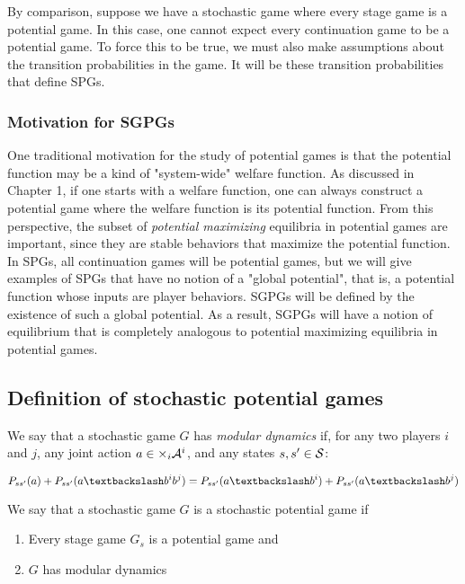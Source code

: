 By comparison, suppose we have a stochastic game where every stage game is a potential game. In this case, one cannot expect every continuation game to be a potential game. To force this to be true, we must also make assumptions about the transition probabilities in the game. It will be these transition probabilities that define SPGs.


\subsubsection{Motivation for SGPGs}

One traditional motivation for the study of potential games is that the potential function may be a kind of "system-wide" welfare function. As discussed in Chapter 1, if one starts with a welfare function, one can always construct a potential game where the welfare function is its potential function. From this perspective, the subset of {\em potential maximizing} equilibria in potential games are important, since they are stable behaviors that maximize the potential function. In SPGs, all continuation games will be potential games, but we will give examples of SPGs that have no notion of a "global potential", that is, a potential function whose inputs are player behaviors. SGPGs will be defined by the existence of such a global potential. As a result, SGPGs will have a notion of equilibrium that is completely analogous to potential maximizing equilibria in potential games.


\subsection{Definition of stochastic potential games}

\begin{mydef}
We say that a stochastic game $G$ has {\em modular dynamics} if, for any two players $i$ and $j$, any joint action $a \in \times_i \AA^i$, and any states $s, s' \in \SS$:

\begin{equation}
P_{ss'}(a) + P_{ss'}(\asub{a}{b^ib^j}) = P_{ss'}(\asub{a}{b^i}) + P_{ss'}(\asub{a}{b^j})
\label{eq:modular}
\end{equation}
\end{mydef}

\label{def:modular}


\begin{mydef}
We say that a stochastic game $G$ is a {stochastic potential game} if

\begin{enumerate}
\item Every stage game $G_s$ is a potential game and

\item $G$ has modular dynamics
\end{enumerate}

\label{def:spg}
\end{mydef}


